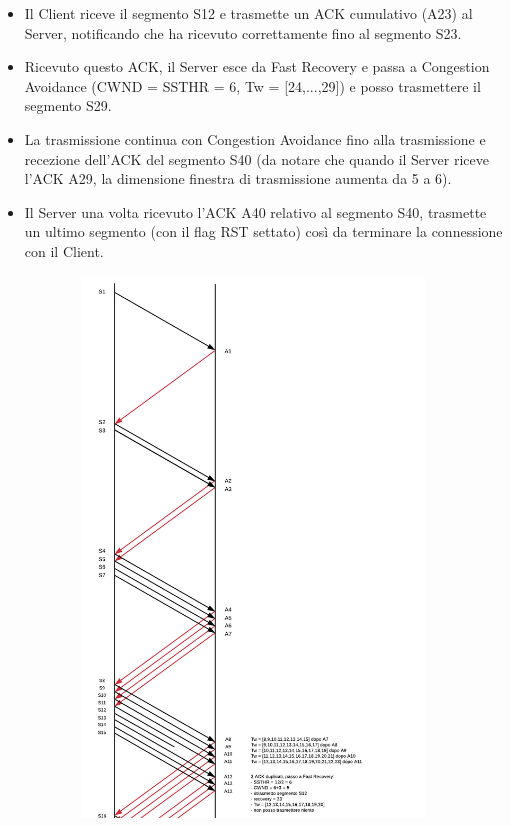 \documentclass[10pt,a4paper]{article}
\begin{document}
\begin{enumerate}
\begin{itemize}
		\item Il Client riceve il segmento S12 e trasmette un ACK cumulativo (A23) al Server, notificando che ha ricevuto correttamente fino al segmento S23.
		\item Ricevuto questo ACK, il Server esce da Fast Recovery e passa a Congestion Avoidance (CWND = SSTHR = 6, Tw = [24,...,29]) e posso trasmettere il segmento S29.
		\item La trasmissione continua con Congestion Avoidance fino alla trasmissione e recezione dell'ACK del segmento S40 (da notare che quando il Server riceve l'ACK A29, la dimensione finestra di trasmissione aumenta da 5 a 6).
		\item Il Server una volta ricevuto l'ACK A40 relativo al segmento S40, trasmette un ultimo segmento (con il flag RST settato) così da terminare la connessione con il Client.
	\end{itemize}
	\newpage
	\begin{figure}[H]
		\begin{subfigure}[b]{9cm}
		  \includegraphics[width=\textwidth]{Esame1262019_Conperdite1}

\end{subfigure}
\end{figure}
\end{enumerate}
\end{document}
